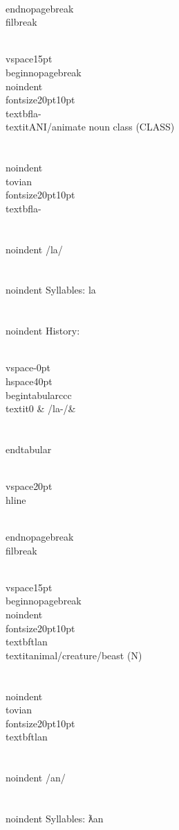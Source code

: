 \\end{nopagebreak}
\\filbreak



\\vspace{15pt}
\\begin{nopagebreak}
\\noindent{\\fontsize{20pt}{10pt}\\textbf{la-} } \\textit{ANI/animate noun class} (CLASS)\\\\
\\noindent {\\tovian \\fontsize{20pt}{10pt} \\textbf{la-} }\\\\
\\noindent /l{\textprimstress}a/\\\\
\\noindent Syllables: la\\\\


\\noindent History:

\\vspace{-0pt}
\\hspace{40pt}
\\begin{tabular}{ccc}
\\textit{0} & /la-/& \\\\
\\end{tabular}

\\vspace{20pt}\\hline

\\end{nopagebreak}
\\filbreak



\\vspace{15pt}
\\begin{nopagebreak}
\\noindent{\\fontsize{20pt}{10pt}\\textbf{tlan} } \\textit{animal/creature/beast} (N)\\\\
\\noindent {\\tovian \\fontsize{20pt}{10pt} \\textbf{tlan} }\\\\
\\noindent /{}{\textprimstress}an/\\\\
\\noindent Syllables: ƛan\\\\


